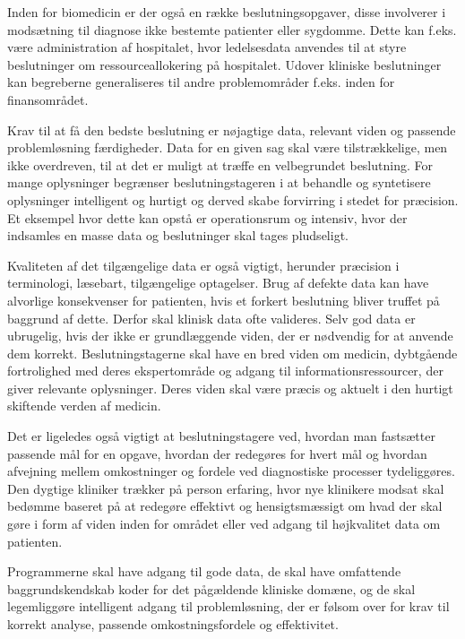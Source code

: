 Inden for biomedicin er der også en række beslutningsopgaver, disse involverer i modsætning til diagnose ikke bestemte patienter eller sygdomme. Dette kan f.eks. være administration af hospitalet, hvor ledelsesdata anvendes til at styre beslutninger om ressourceallokering på hospitalet. Udover kliniske beslutninger kan begreberne generaliseres til andre problemområder f.eks. inden for finansområdet.\citep{Masys2006}

Krav til at få den bedste beslutning er nøjagtige data, relevant viden og passende problemløsning færdigheder. Data for en given sag skal være tilstrækkelige, men ikke overdreven, til at det er muligt at træffe en velbegrundet beslutning. For mange oplysninger begrænser beslutningstageren i at behandle og syntetisere oplysninger intelligent og hurtigt og derved skabe forvirring i stedet for præcision. Et eksempel hvor dette kan opstå er operationsrum og intensiv, hvor der indsamles en masse data og beslutninger skal tages pludseligt. \citep{Masys2006}

Kvaliteten af det tilgængelige data er også vigtigt, herunder præcision i terminologi, læsebart, tilgængelige optagelser. Brug af defekte data kan have alvorlige konsekvenser for patienten, hvis et forkert beslutning bliver truffet på baggrund af dette. Derfor skal klinisk data ofte valideres. Selv god data er ubrugelig, hvis der ikke er grundlæggende viden, der er nødvendig for at anvende dem korrekt. Beslutningstagerne skal have en bred viden om medicin, dybtgående fortrolighed med deres ekspertområde  og adgang til informationsressourcer, der giver relevante oplysninger. Deres viden skal være præcis og aktuelt i den hurtigt skiftende verden af medicin.\citep{Masys2006}

Det er ligeledes også vigtigt at beslutningstagere ved, hvordan man fastsætter passende mål for en opgave, hvordan der redegøres for hvert mål og hvordan afvejning mellem omkostninger og fordele ved diagnostiske processer tydeliggøres. Den dygtige kliniker trækker på person erfaring, hvor nye klinikere modsat skal bedømme baseret på at redegøre effektivt og hensigtsmæssigt om hvad der skal gøre i form af viden inden for området eller ved adgang til højkvalitet data om patienten.\citep{Masys2006} 

Programmerne skal have adgang til gode data, de skal have omfattende baggrundskendskab koder for det pågældende kliniske domæne, og de skal legemliggøre intelligent adgang til problemløsning, der er følsom over for krav til korrekt analyse, passende omkostningsfordele og effektivitet. \citep{Masys2006}

